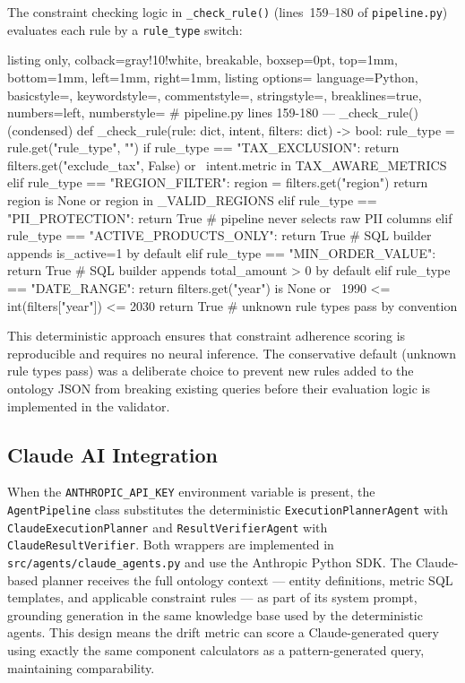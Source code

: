 \documentclass[12pt,a4paper]{report}
\begin{document}
The constraint checking logic in \texttt{\_check\_rule()} (lines~159--180 of \texttt{pipeline.py}) evaluates each rule by a \texttt{rule\_type} switch:

\begin{tcblisting}{listing only, colback=gray!10!white, breakable, boxsep=0pt,
  top=1mm, bottom=1mm, left=1mm, right=1mm,
  listing options={
    language=Python, basicstyle=\small\ttfamily,
    keywordstyle=\color{kwcolor}, commentstyle=\color{cmtcolor},
    stringstyle=\color{strcolor}, breaklines=true,
    numbers=left, numberstyle=\tiny\color{gray}}}
# pipeline.py lines 159-180 — _check_rule() (condensed)
def _check_rule(rule: dict, intent, filters: dict) -> bool:
    rule_type = rule.get("rule_type", "")
    if rule_type == "TAX_EXCLUSION":
        return filters.get("exclude_tax", False) or \
               intent.metric in TAX_AWARE_METRICS
    elif rule_type == "REGION_FILTER":
        region = filters.get("region")
        return region is None or region in _VALID_REGIONS
    elif rule_type == "PII_PROTECTION":
        return True  # pipeline never selects raw PII columns
    elif rule_type == "ACTIVE_PRODUCTS_ONLY":
        return True  # SQL builder appends is_active=1 by default
    elif rule_type == "MIN_ORDER_VALUE":
        return True  # SQL builder appends total_amount > 0 by default
    elif rule_type == "DATE_RANGE":
        return filters.get("year") is None or \
               1990 <= int(filters["year"]) <= 2030
    return True     # unknown rule types pass by convention
\end{tcblisting}

This deterministic approach ensures that constraint adherence scoring is reproducible and requires no neural inference. The conservative default (unknown rule types pass) was a deliberate choice to prevent new rules added to the ontology JSON from breaking existing queries before their evaluation logic is implemented in the validator.

\subsection{Claude AI Integration}
\label{subsec:claude-impl}

When the \texttt{ANTHROPIC\_API\_KEY} environment variable is present, the \texttt{AgentPipeline} class substitutes the deterministic \texttt{ExecutionPlannerAgent} with \texttt{ClaudeExecutionPlanner} and \texttt{ResultVerifierAgent} with \texttt{ClaudeResultVerifier}. Both wrappers are implemented in \texttt{src/agents/claude\_agents.py} and use the Anthropic Python \ac{SDK}. The Claude-based planner receives the full ontology context — entity definitions, metric SQL templates, and applicable constraint rules — as part of its system prompt, grounding generation in the same knowledge base used by the deterministic agents. This design means the drift metric can score a Claude-generated query using exactly the same component calculators as a pattern-generated query, maintaining comparability.
\end{document}
